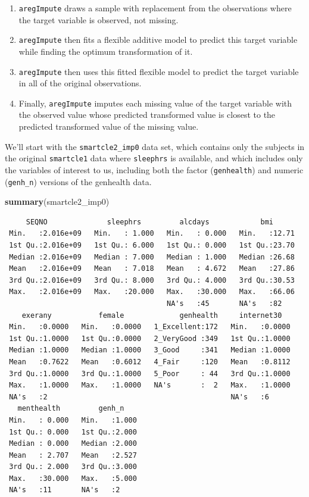 \documentclass[]{book}
\newenvironment{Shaded}{\begin{snugshade}}{\end{snugshade}}
\newcommand{\KeywordTok}[1]{\textcolor[rgb]{0.13,0.29,0.53}{\textbf{#1}}}
\newcommand{\NormalTok}[1]{#1}
\providecommand{\tightlist}{%
  \setlength{\itemsep}{0pt}\setlength{\parskip}{0pt}}
\theoremstyle{definition}
\theoremstyle{definition}
\theoremstyle{definition}
\theoremstyle{remark}
\begin{document}
\begin{enumerate}
\def\labelenumi{\arabic{enumi}.}
\tightlist
\item
  \texttt{aregImpute} draws a sample with replacement from the
  observations where the target variable is observed, not missing.
\item
  \texttt{aregImpute} then fits a flexible additive model to predict
  this target variable while finding the optimum transformation of it.
\item
  \texttt{aregImpute} then uses this fitted flexible model to predict
  the target variable in all of the original observations.
\item
  Finally, \texttt{aregImpute} imputes each missing value of the target
  variable with the observed value whose predicted transformed value is
  closest to the predicted transformed value of the missing value.
\end{enumerate}

We'll start with the \texttt{smartcle2\_imp0} data set, which contains
only the subjects in the original \texttt{smartcle1} data where
\texttt{sleephrs} is available, and which includes only the variables of
interest to us, including both the factor (\texttt{genhealth}) and
numeric (\texttt{genh\_n}) versions of the genhealth data.

\begin{Shaded}
\begin{Highlighting}[]
\KeywordTok{summary}\NormalTok{(smartcle2_imp0)}
\end{Highlighting}
\end{Shaded}

\begin{verbatim}
     SEQNO              sleephrs         alcdays            bmi       
 Min.   :2.016e+09   Min.   : 1.000   Min.   : 0.000   Min.   :12.71  
 1st Qu.:2.016e+09   1st Qu.: 6.000   1st Qu.: 0.000   1st Qu.:23.70  
 Median :2.016e+09   Median : 7.000   Median : 1.000   Median :26.68  
 Mean   :2.016e+09   Mean   : 7.018   Mean   : 4.672   Mean   :27.86  
 3rd Qu.:2.016e+09   3rd Qu.: 8.000   3rd Qu.: 4.000   3rd Qu.:30.53  
 Max.   :2.016e+09   Max.   :20.000   Max.   :30.000   Max.   :66.06  
                                      NA's   :45       NA's   :82     
    exerany           female             genhealth     internet30    
 Min.   :0.0000   Min.   :0.0000   1_Excellent:172   Min.   :0.0000  
 1st Qu.:1.0000   1st Qu.:0.0000   2_VeryGood :349   1st Qu.:1.0000  
 Median :1.0000   Median :1.0000   3_Good     :341   Median :1.0000  
 Mean   :0.7622   Mean   :0.6012   4_Fair     :120   Mean   :0.8112  
 3rd Qu.:1.0000   3rd Qu.:1.0000   5_Poor     : 44   3rd Qu.:1.0000  
 Max.   :1.0000   Max.   :1.0000   NA's       :  2   Max.   :1.0000  
 NA's   :2                                           NA's   :6       
   menthealth         genh_n     
 Min.   : 0.000   Min.   :1.000  
 1st Qu.: 0.000   1st Qu.:2.000  
 Median : 0.000   Median :2.000  
 Mean   : 2.707   Mean   :2.527  
 3rd Qu.: 2.000   3rd Qu.:3.000  
 Max.   :30.000   Max.   :5.000  
 NA's   :11       NA's   :2      
\end{verbatim}
\end{document}
